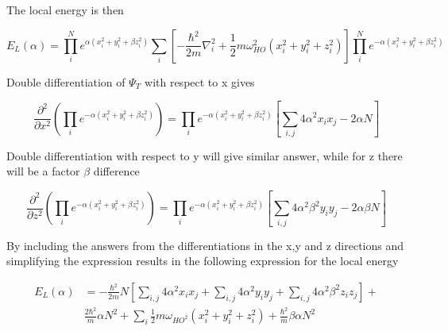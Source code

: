 \documentclass[norsk,a4paper,12pt]{article}
\begin{document}
The local energy is then

\begin{equation}
	E_L(\alpha) = \prod_i^N e^{\alpha(x_i^2 + y_i^2 + \beta z_i^2)} \sum_i [ -\frac{\hbar^2}{2m} \nabla_i^2 + \frac{1}{2}m\omega_{HO}^2(x_i^2 + y_i^2 + z_i^2)] \prod_i^N e^{-\alpha(x_i^2 + y_i^2 + \beta z_i^2)}
\end{equation}

Double differentiation of $\Psi_T$ with respect to x gives

\begin{equation}
	\frac{\partial^2}{\partial x^2} (\prod_i e^{-\alpha(x_i^2 + y_i^2 + \beta z_i^2)}) = \prod_i e^{-\alpha(x_i^2 + y_i^2 + \beta z_i^2)} [\sum_{i,j} 4 \alpha^2 x_i x_j -2 \alpha N ]
\end{equation}

Double differentiation with respect to y will give similar answer, while for z there will be a factor $\beta$ difference

\begin{equation}
\frac{\partial^2}{\partial z^2} (\prod_i e^{-\alpha(x_i^2 + y_i^2 + \beta z_i^2)}) = \prod_i e^{-\alpha(x_i^2 + y_i^2 + \beta z_i^2)} [\sum_{i,j} 4 \alpha^2 \beta^2 y_i y_j -2 \alpha \beta N ]
\end{equation}

By including the answers from the differentiations in the x,y and z directions and simplifying the expression results in the following expression for the local energy

\begin{equation}
\begin{aligned}
	E_L(\alpha) & = -\frac{\hbar^2}{2m} N [ \sum_{i,j} 4 \alpha^2 x_i x_j + \sum_{i,j} 4 \alpha^2 y_i y_j + \sum_{i,j} 4 \alpha^2 \beta^2 z_i z_j] +  \\ & \frac{2 \hbar^2}{m}\alpha N^2 + \sum_i \frac{1}{2}m\omega_{HO^2}(x_i^2 + y_i^2 + z_i^2) + \frac{\hbar^2}{m}\beta \alpha N^2
\end{aligned}
\end{equation}
\end{document}
